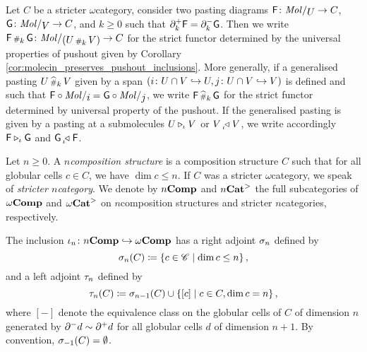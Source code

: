 \begin{dfn} 
    Let \( C \) be a stricter \( \omega \)\nbd category, consider two pasting diagrams \( \F \colon \molecin{U} \to C \), \( \G \colon \molecin{V} \to C \), and \( k \geq 0 \) such that \( \partial_{k}^{+} \mathsf{F} = \partial_{k}^{-} \mathsf{G} \).
    Then we write \( \F \cp{k} \G \colon \molecin{(U \cp{k} V)} \to C \) for the strict functor determined by the universal properties of pushout given by Corollary \ref{cor:molecin_preserves_pushout_inclusions}.
    More generally, if a generalised pasting \( U \,{\scriptstyle\widehat{\#}}_{k}\, V \) given by a span \( (i \colon U \cap V \hookrightarrow U, j \colon U \cap V \hookrightarrow V) \) is defined and such that \( \F \after \molecin{i} = \G \after \molecin{j} \), we write \( \mathsf{F} \,{\scriptstyle\widehat{\#}}_{k}\, \mathsf{G} \) for the strict functor determined by universal property of the pushout.
    If the generalised pasting is given by a pasting at a submolecules \( U \triangleright_{\iota} V \) or \( V \prescript{}{\iota\!}{\triangleleft}\; V \), we write accordingly \( \mathsf{F} \triangleright_{\iota} \mathsf{G} \) and \( \mathsf{G} \prescript{}{\iota\!}{\triangleleft}\; \mathsf{F} \).
\end{dfn}

\begin{dfn} 
    Let \( n \geq 0 \).
    A \emph{\( n \)\nbd composition structure} is a composition structure \( C \) such that for all globular cells \( c \in C \), we have \( \dim c \le n \).
    If \( C \) was a stricter \( \omega \)\nbd category, we speak of \emph{stricter \( n \)\nbd category}.
    We denote by \( {n\mathbf{Comp}} \) and \( {n\mathbf{Cat}}^> \) the full subcategories of \( \omega\mathbf{Comp} \) and \( {\omega\mathbf{Cat}}^> \) on \( n \)\nbd composition structures and stricter \( n \)\nbd categories, respectively. 
\end{dfn}

\begin{dfn} 
    The inclusion \( \iota_n \colon {n\mathbf{Comp}} \hookrightarrow \omega\mathbf{Comp} \) has a right adjoint \( \sigma_{n} \) defined by
    \begin{equation*}
        \sigma_{n}(C) \coloneqq \left\{ {c \in \mathscr{C} \mid \dim c \le n} \right\},
    \end{equation*}
    and a left adjoint \( \tau_{n} \) defined by
    \begin{equation*}
        \tau_{n}(C) \coloneqq \sigma_{n - 1}(C) \cup \left\{ {[c] \mid c \in C, \dim c = n} \right\},
    \end{equation*}
    where \( [-] \) denote the equivalence class on the globular cells of \( C \) of dimension \( n \) generated by \( \partial_{}^{-} d \sim \partial_{}^{+} d \) for all globular cells \( d \) of dimension \( n + 1 \). 
    By convention, \( \sigma_{-1}(C) = \emptyset \).
\end{dfn}


